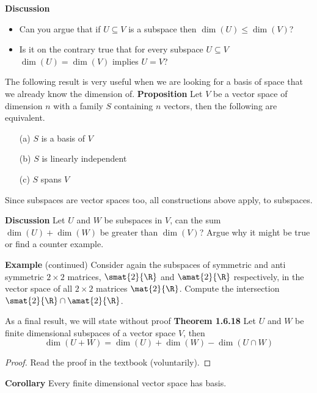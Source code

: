 \documentclass[letterpaper, 10pt]{article}
\begin{document}
\lb
\textbf{Discussion}
\begin{itemize}
    \item
    Can you argue that if $U \subseteq V$ is a subspace then $\dim (U) \leq \dim(V)$?
    \item
    Is it on the contrary true that for every subspace $U \subseteq V$
    $\dim(U) = \dim(V)$ implies  $U = V$?
\end{itemize}




\newpage
\lb
The following result is very useful when we are looking for a basis
of space that we already know the dimension of.
\lb
\textbf{Proposition}
\lb
Let $V$ be a vector space of dimension $n$ with a family $S$ containing $n$ vectors,
then the following are equivalent.
\begin{enumerate}
    \item[(a)]
        $S$ is a basis of $V$
    \item[(b)]
        $S$ is linearly independent
    \item[(c)]
        $S$ spans $V$
\end{enumerate}


\newpage

\lb
Since subspaces are vector spaces too, all constructions above apply, to subspaces.


\lb
\textbf{Discussion}
\lb
Let $U$ and $W$ be subspaces in $V$, can the sum $\dim(U) + \dim(W)$ be greater than $\dim(V)$?
\pr
Argue why it might be true or find a counter example.


\lb
\textbf{Example} (continued)
\lb
Consider again the subspaces of symmetric and anti symmetric $2 \times 2$ matrices,
$\smat{2}{\R}$ and $\amat{2}{\R}$ respectively, in the vector space of all $2 \times 2$
matrices $\mat{2}{\R}$.
Compute the intersection $\smat{2}{\R} \cap \amat{2}{\R}$.


\lb
As a final result, we will state without proof
\lb
\textbf{Theorem 1.6.18}
\lb
Let $U$ and $W$ be finite dimensional subspaces of a vector space $V$, then
\[ \dim (U + W) = \dim (U) + \dim(W) - \dim (U \cap W) \]
\begin{proof}
    Read the proof in the textbook (voluntarily).
\end{proof}


\lb
\textbf{Corollary}
\lb
Every finite dimensional vector space has basis.
\end{document}
